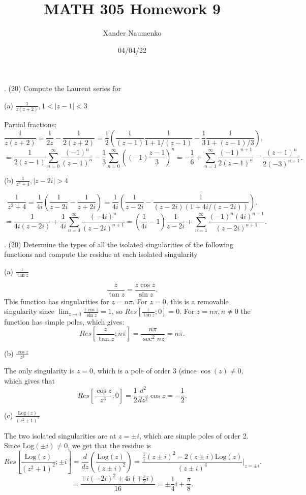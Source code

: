 \documentclass[letterpaper, reqno,11pt]{article}
\begin{document}
\title{MATH 305 Homework 9}
\date{04/04/22}
\author{Xander Naumenko}
\maketitle

. (20) Compute the Laurent series for

(a) $ \frac{1}{ z(z+2)}, 1<|z-1|<3$

Partial fractions: 
\[
\frac{1}{z(z+2)}=\frac{1}{2z}-\frac{1}{2(z+2)}=\frac{1}{2}\left( \frac{1}{(z-1)}\frac{1}{1+1 /(z-1)}-\frac{1}{3}\frac{1}{1+(z-1) /3} \right) 
.\]
\[
=\frac{1}{2(z-1)}\sum_{n=0}^\infty \frac{(-1)^{n}}{(z-1)^{n}}-\frac{1}{3}\sum_{n=0}^{\infty}\left( (-1)\frac{z-1}{3} \right) ^{n}=-\frac{1}{6}+\sum_{n=1}^{\infty}\frac{(-1)^{n+1}}{2(z-1)^{n}}-\frac{(z-1)^{n}}{2(-3)^{n+1}}
.\]

(b) $\frac{1}{z^2+4}, |z-2i|>4$

\[
\frac{1}{z^2+4}=\frac{1}{4i}\left(\frac{1}{z-2i}-\frac{1}{z+2i}\right)=\frac{1}{4i}\left( \frac{1}{z-2i}-\frac{1}{(z-2i)\left( 1+4i /(z-2i) \right) } \right) 
.\]
\[
=\frac{1}{4i(z-2i)}+\frac{1}{4i}\sum_{n=0}^{\infty}\frac{(-4i)^{n}}{(z-2i)^{n+1}}=(\frac{1}{4i}-1) \frac{1}{z-2i}+\sum_{n=1}^{\infty}\frac{(-1)^{n}(4i)^{n-1}}{(z-2i)^{n+1}}
.\]


\medskip



. (20) Determine the types of all the isolated singularities of the following  functions and compute the residue at each isolated singularity

(a) $\frac{z}{\tan z}$


\[
\frac{z}{\tan z}=\frac{z\cos z}{\sin z}
.\]
This function has singularities for $z=n\pi$. For $z=0$, this is a removable singularity since $\lim_{z\to 0}\frac{z\cos z}{\sin z}=1$, so $Res[\frac{z}{\tan z}; 0]=0$. For $z=n\pi, n\neq 0$ the function has simple poles, which gives:
\[
Res[\frac{z}{\tan z}; n\pi]=\frac{n\pi}{\sec^2 nz}=n\pi
.\]

(b) $ \frac{\cos z}{z^3}$

The only singularity is $z=0$, which is a pole of order 3 (since $\cos(z)\neq 0$, which gives that
\[
Res[\frac{\cos z}{z^3};0]=\frac{1}{2}\frac{d^2}{dz^2}\cos z=-\frac{1}{2}
.\]

(c) $ \frac{\mbox{Log} (z) }{ (z^2+1)^2 }$

The two isolated singularities are at $z=\pm i$, which are simple poles of order 2. Since $\mbox{Log}(\pm i)\neq 0$, we get that the residue is
 \[
Res[\frac{\mbox{Log}(z)}{(z^2+1)^2};\pm i]=\frac{d}{dz}\left( \frac{\mbox{Log}(z)}{(z\pm i)^2} \right)=\frac{\frac{1}{z}(z\pm i)^2-2(z\pm i)\mbox{Log}(z)}{(z\pm i)^4}\bigg|_{z=\pm i}
.\]
\[
=\frac{\mp i (-2i)^2\pm 4i(\mp \frac{\pi}{2}i)}{16}=\pm \frac{1}{4}i+\frac{\pi}{8}
.\]
\end{document}
